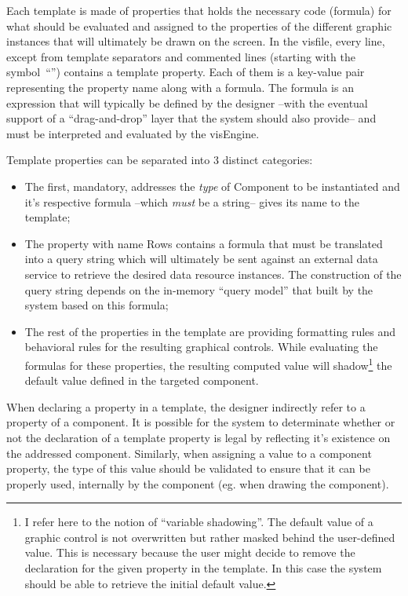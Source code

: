 Each template is made of properties that holds the necessary code (formula) for what should be evaluated and assigned to the properties of the different graphic instances that will ultimately be drawn on the screen. In the visfile, every line, except from template separators and commented lines (starting with the symbol~``\textquotesingle'') contains a template property. Each of them is a key-value pair representing the property name along with a formula. The formula is an expression that will typically be defined by the designer --with the eventual support of a ``drag-and-drop'' layer that the system should also provide-- and must be interpreted and evaluated by the visEngine.

Template properties can be separated into 3 distinct categories:
\begin{itemize}
    \item The first, mandatory, addresses the \emph{type} of Component to be instantiated and it's respective formula --which \emph{must} be a string-- gives its name to the template;
    \item The property with name Rows contains a formula that must be translated into a query string which will ultimately be sent against an external data service to retrieve the desired data resource instances. The construction of the query string depends on the in-memory ``query model'' that built by the system based on this formula;
    \item The rest of the properties in the template are providing formatting rules and behavioral rules for the resulting graphical controls. While evaluating the formulas for these properties, the resulting computed value will shadow\footnote{I refer here to the notion of ``variable shadowing''. The default value of a graphic control is not overwritten but rather masked behind the user-defined value. This is necessary because the user might decide to remove the declaration for the given property in the template. In this case the system should be able to retrieve the initial default value.} the default value defined in the targeted component.
\end{itemize}

When declaring a property in a template, the designer indirectly refer to a property of a component. It is possible for the system to determinate whether or not the declaration of a template property is legal by reflecting it's existence on the addressed component. Similarly, when assigning a value to a component property, the type of this value should be validated to ensure that it can be properly used, internally by the component (eg. when drawing the component).

